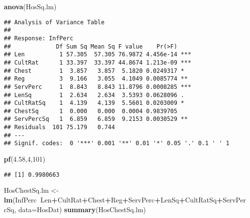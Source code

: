 \documentclass[]{article}
\newenvironment{Shaded}{\begin{snugshade}}{\end{snugshade}}
\newcommand{\KeywordTok}[1]{\textcolor[rgb]{0.13,0.29,0.53}{\textbf{#1}}}
\newcommand{\DataTypeTok}[1]{\textcolor[rgb]{0.13,0.29,0.53}{#1}}
\newcommand{\DecValTok}[1]{\textcolor[rgb]{0.00,0.00,0.81}{#1}}
\newcommand{\FloatTok}[1]{\textcolor[rgb]{0.00,0.00,0.81}{#1}}
\newcommand{\StringTok}[1]{\textcolor[rgb]{0.31,0.60,0.02}{#1}}
\newcommand{\OperatorTok}[1]{\textcolor[rgb]{0.81,0.36,0.00}{\textbf{#1}}}
\newcommand{\NormalTok}[1]{#1}
\begin{document}
\begin{Shaded}
\begin{Highlighting}[]
\KeywordTok{anova}\NormalTok{(HosSq.lm)}
\end{Highlighting}
\end{Shaded}

\begin{verbatim}
## Analysis of Variance Table
## 
## Response: InfPerc
##             Df Sum Sq Mean Sq F value    Pr(>F)    
## Len          1 57.305  57.305 76.9872 4.456e-14 ***
## CultRat      1 33.397  33.397 44.8674 1.213e-09 ***
## Chest        1  3.857   3.857  5.1820 0.0249317 *  
## Reg          3  9.166   3.055  4.1049 0.0085774 ** 
## ServPerc     1  8.843   8.843 11.8796 0.0008285 ***
## LenSq        1  2.634   2.634  3.5393 0.0628096 .  
## CultRatSq    1  4.139   4.139  5.5601 0.0203009 *  
## ChestSq      1  0.000   0.000  0.0004 0.9839705    
## ServPercSq   1  6.859   6.859  9.2153 0.0030529 ** 
## Residuals  101 75.179   0.744                      
## ---
## Signif. codes:  0 '***' 0.001 '**' 0.01 '*' 0.05 '.' 0.1 ' ' 1
\end{verbatim}

\begin{Shaded}
\begin{Highlighting}[]
\KeywordTok{pf}\NormalTok{(}\FloatTok{4.58}\NormalTok{,}\DecValTok{4}\NormalTok{,}\DecValTok{101}\NormalTok{)}
\end{Highlighting}
\end{Shaded}

\begin{verbatim}
## [1] 0.9980663
\end{verbatim}

\begin{Shaded}
\begin{Highlighting}[]
\NormalTok{HosChestSq.lm <-}\StringTok{ }\KeywordTok{lm}\NormalTok{(InfPerc}\OperatorTok{~}\NormalTok{Len}\OperatorTok{+}\NormalTok{CultRat}\OperatorTok{+}\NormalTok{Chest}\OperatorTok{+}\NormalTok{Reg}\OperatorTok{+}\NormalTok{ServPerc}\OperatorTok{+}\NormalTok{LenSq}\OperatorTok{+}\NormalTok{CultRatSq}\OperatorTok{+}\NormalTok{ServPercSq, }\DataTypeTok{data=}\NormalTok{HosDat)}
\KeywordTok{summary}\NormalTok{(HosChestSq.lm)}
\end{Highlighting}
\end{Shaded}
\end{document}
